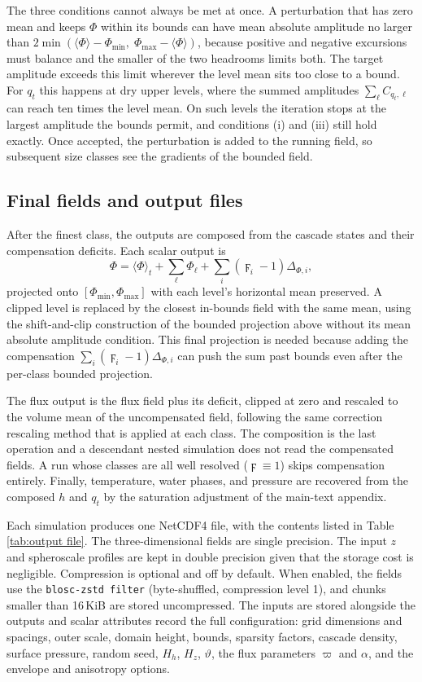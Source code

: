 \documentclass{article}
\begin{document}
The three conditions cannot always be met at once. A perturbation that
has zero mean and keeps $\Phi$ within its bounds can have mean absolute
amplitude no larger than $2\min(\langle\Phi\rangle - \Phi_{\min},\;
\Phi_{\max} - \langle\Phi\rangle)$, because positive and negative
excursions must balance and the smaller of the two headrooms limits
both. The target amplitude exceeds this limit wherever the level mean
sits too close to a bound. For $q_t$ this happens at dry upper levels,
where the summed amplitudes $\sum_\ell C_{q_t,\ell}$ can reach ten times the
level mean. On such levels the iteration stops at the largest amplitude
the bounds permit, and conditions (i) and (iii) still hold exactly.
Once accepted, the perturbation is added to the running field, so
subsequent size classes see the gradients of the bounded field.

\subsection{Final fields and output files}\label{ssect:final fields}

After the finest class, the outputs are composed from the cascade
states and their compensation deficits. Each scalar output is 
$$\Phi =
\langle \Phi \rangle_t + \sum_\ell \Phi_\ell + \sum_i (\digamma_i - 1)
\Delta_{\Phi,i},$$
projected onto $[\Phi_{\min}, \Phi_{\max}]$ with each level's horizontal mean preserved. A clipped level is replaced by the closest in-bounds field with the same mean, using the shift-and-clip construction of the bounded projection above without its mean absolute amplitude condition. This final projection is needed because
adding the compensation $\sum_i (\digamma_i - 1)
\Delta_{\Phi,i}$ can push the sum past
bounds even after the per-class bounded projection. 

The flux output is the flux field plus its deficit, clipped
at zero and rescaled to the volume mean of the uncompensated field,
following the same correction rescaling method that is applied at each class. The composition is the last
operation and a descendant nested simulation does not read the compensated fields. A run whose classes are all well resolved ($\digamma \equiv 1$) skips
compensation entirely. Finally, temperature, water phases, and pressure are
recovered from the composed $h$ and $q_t$ by the saturation adjustment
of the main-text appendix.

Each simulation produces one NetCDF4 file, with the contents listed in
Table \ref{tab:output file}. The three-dimensional fields are single
precision. The input $z$ and spheroscale profiles are kept in double
precision given that the storage cost is negligible.
Compression is optional and off by default. When enabled,
the fields use the \verb|blosc-zstd filter| (byte-shuffled, compression level
1), and chunks smaller than 16\,KiB are stored uncompressed. The
inputs are stored alongside the outputs and scalar attributes record the full configuration:
grid dimensions and spacings, outer scale, domain height, bounds,
sparsity factors, cascade density, surface pressure, random seed,
$H_h$, $H_z$, $\vartheta$, the flux parameters $\varpi$ and $\alpha$, and
the envelope and anisotropy options. 
\end{document}
